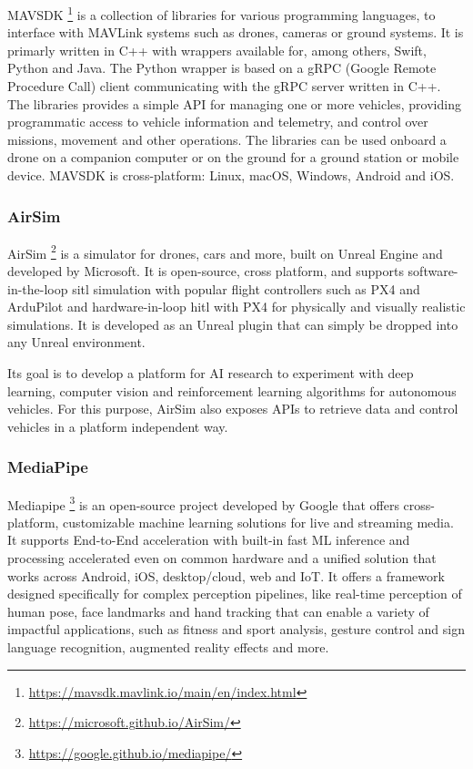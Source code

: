 MAVSDK \footnote{\url{https://mavsdk.mavlink.io/main/en/index.html}} is a collection of libraries for various programming languages,
to interface with MAVLink systems such as drones, cameras or ground systems.
It is primarly written in C++ with wrappers available for,
among others, Swift, Python and Java.
The Python wrapper is based on a gRPC (Google Remote Procedure Call) client communicating with the gRPC server written in C++.
The libraries provides a simple API for managing one or more vehicles, 
providing programmatic access to vehicle information and telemetry, 
and control over missions, movement and other operations.
The libraries can be used onboard a drone on a companion computer
or on the ground for a ground station or mobile device.
MAVSDK is cross-platform: Linux, macOS, Windows, Android and iOS.


\subsubsection{AirSim}
\label{subsec:airsim}
AirSim \footnote{\url{https://microsoft.github.io/AirSim/}} is a simulator for drones, cars and more, built on Unreal Engine and developed by Microsoft. It is open-source, cross platform, and supports software-in-the-loop \gls{sitl} simulation with popular flight controllers such as PX4 and ArduPilot and hardware-in-loop \gls{hitl} with PX4 for physically and visually realistic simulations. It is developed as an Unreal plugin that can simply be dropped into any Unreal environment.

Its goal is to develop a platform for AI research to experiment with deep learning, computer vision and reinforcement learning algorithms for autonomous vehicles. For this purpose, AirSim also exposes APIs to retrieve data and control vehicles in a platform independent way.

\subsubsection{MediaPipe}
\label{subsec:mediapipe}
Mediapipe \footnote{\url{https://google.github.io/mediapipe/}} is an open-source project developed by Google that offers cross-platform, customizable machine learning solutions for live and streaming media.
It supports End-to-End acceleration with built-in fast ML inference and processing accelerated even on common hardware and a unified solution that works across Android, iOS, desktop/cloud, web and IoT.
It offers a framework designed specifically for complex perception pipelines, like real-time perception of human pose, face landmarks and hand tracking that can enable a variety of impactful applications, such as fitness and sport analysis, gesture control and sign language recognition, augmented reality effects and more. 


